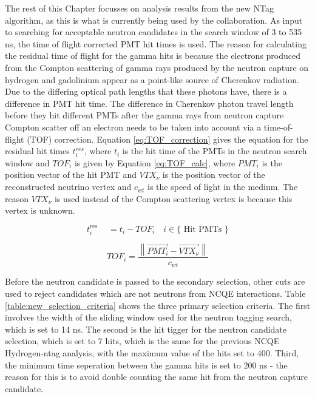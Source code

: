 The rest of this Chapter focusses on analysis results from the new NTag algorithm, as this is what is currently being used by the collaboration. As input to searching for acceptable neutron candidates in the search window of 3 to 535 ns, the time of flight corrected PMT hit times is used. The reason for calculating the residual time of flight for the gamma hits is because the electrons produced from the Compton scattering of gamma rays produced by the neutron capture on hydrogen and gadolinium appear as a point-like source of Cherenkov radiation. Due to the differing optical path lengths that these photons have, there is a difference in PMT hit time. The difference in Cherenkov photon travel length before they hit different PMTs after the gamma rays from neutron capture Compton scatter off an electron needs to be taken into account via a time-of-flight (TOF) correction. Equation \ref{eq:TOF_correction} gives the equation for the residual hit times $t_{i}^{res}$, where $t_{i}$ is the hit time of the PMTs in the neutron search window and $TOF_{i}$ is given by Equation \ref{eq:TOF_calc}, where $PMT_{i}$ is the position vector of the hit PMT and $VTX_{\nu}$ is the position vector of the reconstructed neutrino vertex and $c_{wt}$ is the speed of light in the medium. The reason $VTX_{\nu}$ is used instead of the Compton scattering vertex is because this vertex is unknown. 

\begin{equation}
    t_i^{\text {res }} \quad=t_i-T O F_i \quad i \in\{\text { Hit PMTs }\}
    \label{eq:TOF_correction}
\end{equation}

\begin{equation}
T O F_i=\frac{\left\|\overrightarrow{P M T_i}-\overrightarrow{V T X_\nu}\right\|}{c_{w t}}
\label{eq:TOF_calc}
\end{equation}

Before the neutron candidate is passed to the secondary selection, other cuts are used to reject candidates which are not neutrons from NCQE interactions. Table \ref{table:new_selection_criteria} shows the three primary selection criteria. The first involves the width of the sliding window used for the neutron tagging search, which is set to 14 ns. The second is the hit tigger for the neutron candidate selection, which is set to 7 hits, which is the same for the previous NCQE Hydrogen-ntag analysis, with the maximum value of the hits set to 400. Third, the minimum time seperation between the gamma hits is set to 200 ns - the reason for this is to avoid double counting the same hit from the neutron capture candidate. 


